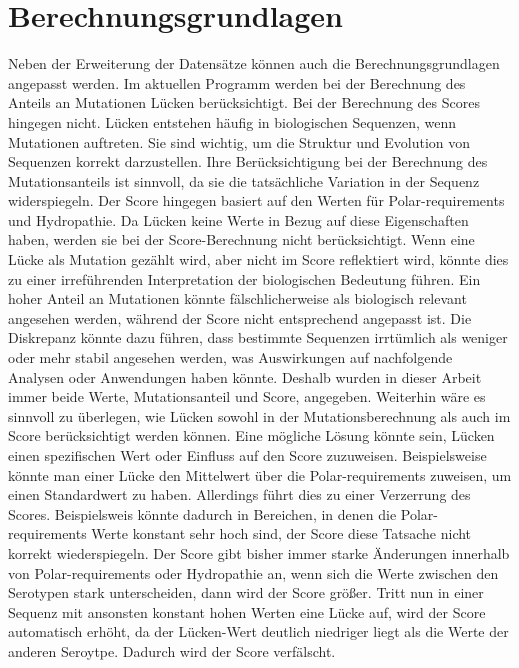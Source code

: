 \documentclass[german,version-2022-01]{uzl-thesis}
\begin{document}
\section{Berechnungsgrundlagen}
Neben der Erweiterung der Datens\"atze k\"onnen auch die Berechnungsgrundlagen angepasst werden. Im aktuellen Programm werden bei der Berechnung des Anteils an Mutationen L\"ucken ber\"ucksichtigt. Bei der Berechnung des Scores hingegen nicht. L\"ucken entstehen h\"aufig in biologischen Sequenzen, wenn Mutationen auftreten. Sie sind wichtig, um die Struktur und Evolution von Sequenzen korrekt darzustellen. Ihre Ber\"ucksichtigung bei der Berechnung des Mutationsanteils ist sinnvoll, da sie die tats\"achliche Variation in der Sequenz widerspiegeln. Der Score hingegen basiert auf den Werten f\"ur Polar-requirements und Hydropathie. Da L\"ucken keine Werte in Bezug auf diese Eigenschaften haben, werden sie bei der Score-Berechnung nicht ber\"ucksichtigt. Wenn eine L\"ucke als Mutation gez\"ahlt wird, aber nicht im Score reflektiert wird, k\"onnte dies zu einer irref\"uhrenden Interpretation der biologischen Bedeutung f\"uhren. Ein hoher Anteil an Mutationen k\"onnte f\"alschlicherweise als biologisch relevant angesehen werden, w\"ahrend der Score nicht entsprechend angepasst ist. Die Diskrepanz k\"onnte dazu f\"uhren, dass bestimmte Sequenzen irrt\"umlich als weniger oder mehr stabil angesehen werden, was Auswirkungen auf nachfolgende Analysen oder Anwendungen haben k\"onnte. Deshalb wurden in dieser Arbeit immer beide Werte, Mutationsanteil und Score, angegeben. Weiterhin w\"are es sinnvoll zu \"uberlegen, wie L\"ucken sowohl in der Mutationsberechnung als auch im Score ber\"ucksichtigt werden k\"onnen. Eine m\"ogliche L\"osung k\"onnte sein, L\"ucken einen spezifischen Wert oder Einfluss auf den Score zuzuweisen. Beispielsweise k\"onnte man einer L\"ucke den Mittelwert \"uber die Polar-requirements zuweisen, um einen Standardwert zu haben. Allerdings f\"uhrt dies zu einer Verzerrung des Scores. Beispielsweis k\"onnte dadurch in Bereichen, in denen die Polar-requirements Werte konstant sehr hoch sind, der Score diese Tatsache nicht korrekt wiederspiegeln. Der Score gibt bisher immer starke \"Anderungen innerhalb von Polar-requirements oder Hydropathie an, wenn sich die Werte zwischen den Serotypen stark unterscheiden, dann wird der Score gr\"o\ss{}er. Tritt nun in einer Sequenz mit ansonsten konstant hohen Werten eine L\"ucke auf, wird der Score automatisch erh\"oht, da der L\"ucken-Wert deutlich niedriger liegt als die Werte der anderen Seroytpe. Dadurch wird der Score verf\"alscht.
\end{document}

